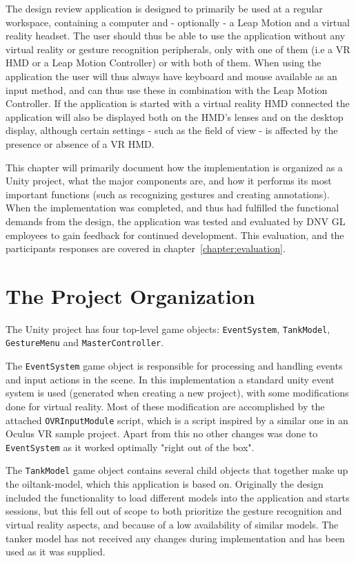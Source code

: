 The design review application is designed to primarily be used at a regular workspace, containing a computer and - optionally - a Leap Motion and a virtual reality headset.
The user should thus be able to use the application without any virtual reality or gesture recognition peripherals, only with one of them (i.e a VR HMD or a Leap Motion Controller) 
or with both of them. When using the application the user will thus always have keyboard and mouse available as an input method, 
and can thus use these in combination with the Leap Motion Controller. If the application is started with a virtual reality HMD connected the application will also be displayed
both on the HMD's lenses and on the desktop display, although certain settings - such as the field of view - is affected by the presence or absence of a VR HMD. 

This chapter will primarily document how the implementation is organized as a Unity project, what the major components are, and how it performs its most important functions
(such as recognizing gestures and creating annotations). When the implementation was completed, and thus had fulfilled the functional demands from the design, 
the application was tested and evaluated by DNV GL employees to gain feedback for continued development. This evaluation, and the participants responses are 
covered in chapter~\ref{chapter:evaluation}.

\section{The Project Organization}
The Unity project has four top-level game objects: \texttt{EventSystem}, \texttt{TankModel}, \texttt{GestureMenu} and \texttt{MasterController}. 

The \texttt{EventSystem} game object is responsible for processing and handling events and input actions in the scene. 
In this implementation a standard unity event system is used (generated when creating a new project), with some modifications done for virtual reality.
Most of these modification are accomplished by the attached \texttt{OVRInputModule} script, which is a script inspired by a similar one in an Oculus VR sample project. 
Apart from this no other changes was done to \texttt{EventSystem} as it worked optimally "right out of the box".

The \texttt{TankModel} game object contains several child objects that together make up the oiltank-model, which this application is based on.
Originally the design included the functionality to load different models into the application and starts sessions, but 
this fell out of scope to both prioritize the gesture recognition and virtual reality aspects, and because of a low availability of similar models.
The tanker model has not received any changes during implementation and has been used as it was supplied. 

